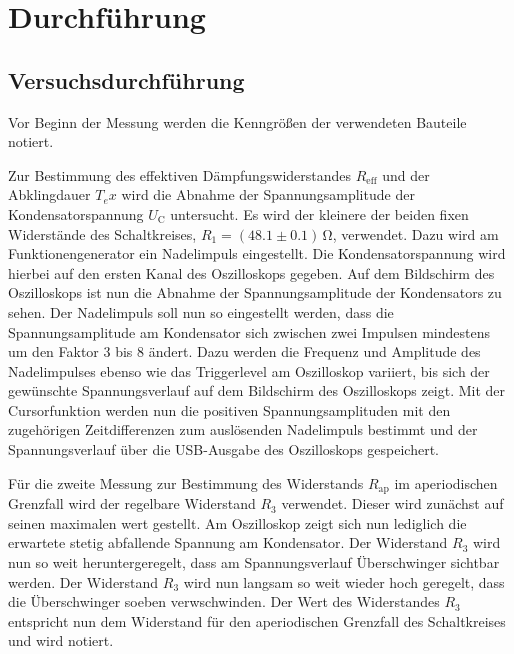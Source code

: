 \section{Durchführung}
\label{sec:Durchführung}



\subsection{Versuchsdurchführung}
\label{sec:Versuchsbeschreibung}

Vor Beginn der Messung werden die Kenngrößen der verwendeten Bauteile notiert.

Zur Bestimmung des effektiven Dämpfungswiderstandes $R_\text{eff}$ und der Abklingdauer $T_ex$ wird die Abnahme der Spannungsamplitude der Kondensatorspannung $U_\text{C}$ untersucht.
Es wird der kleinere der beiden fixen Widerstände des Schaltkreises, $R_\text{1}=(48.1 \pm 0.1)\,\si{\ohm}$, verwendet.
Dazu wird am Funktionengenerator ein Nadelimpuls eingestellt.
Die Kondensatorspannung wird hierbei auf den ersten Kanal des Oszilloskops gegeben.
Auf dem Bildschirm des Oszilloskops ist nun die Abnahme der Spannungsamplitude der Kondensators zu sehen.
Der Nadelimpuls soll nun so eingestellt werden, dass die Spannungsamplitude am Kondensator sich zwischen zwei Impulsen mindestens um den Faktor 3 bis 8 ändert.
Dazu werden die Frequenz und Amplitude des Nadelimpulses ebenso wie das Triggerlevel am Oszilloskop variiert, bis sich der gewünschte Spannungsverlauf auf dem Bildschirm des Oszilloskops zeigt.
Mit der Cursorfunktion werden nun die positiven Spannungsamplituden mit den zugehörigen Zeitdifferenzen zum auslösenden Nadelimpuls bestimmt und der Spannungsverlauf über die USB-Ausgabe des Oszilloskops gespeichert.

Für die zweite Messung zur Bestimmung des Widerstands $R_\text{ap}$ im aperiodischen Grenzfall wird der regelbare Widerstand $R_\text{3}$ verwendet.
Dieser wird zunächst auf seinen maximalen wert gestellt. Am Oszilloskop zeigt sich nun lediglich die erwartete stetig abfallende Spannung am Kondensator.
Der Widerstand $R_\text{3}$ wird nun so weit heruntergeregelt, dass am Spannungsverlauf Überschwinger sichtbar werden.
Der Widerstand $R_\text{3}$ wird nun langsam so weit wieder hoch geregelt, dass die Überschwinger soeben verwschwinden. Der Wert des Widerstandes $R_\text{3}$ entspricht nun dem Widerstand für den aperiodischen Grenzfall des Schaltkreises und wird notiert.

